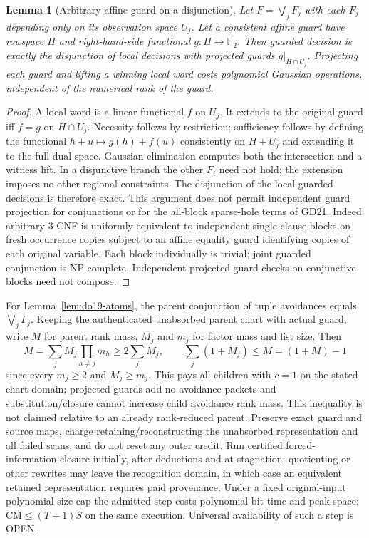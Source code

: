 \documentclass[11pt]{article}
\newtheorem{lemma}[theorem]{Lemma}
\begin{document}
\begin{lemma}[Arbitrary affine guard on a disjunction]\label{lem:do19-guard}
Let $F=\bigvee_j F_j$ with each $F_j$ depending only on its observation space $U_j$. Let a consistent affine guard have rowspace $H$ and right-hand-side functional $g:H\to\mathbb F_2$. Then guarded decision is exactly the disjunction of local decisions with projected guards $g|_{H\cap U_j}$. Projecting each guard and lifting a winning local word costs polynomial Gaussian operations, independent of the numerical rank of the guard.
\end{lemma}
\begin{proof}
A local word is a linear functional $f$ on $U_j$. It extends to the original guard iff $f=g$ on $H\cap U_j$. Necessity follows by restriction; sufficiency follows by defining the functional $h+u\mapsto g(h)+f(u)$ consistently on $H+U_j$ and extending it to the full dual space. Gaussian elimination computes both the intersection and a witness lift. In a disjunctive branch the other $F_i$ need not hold; the extension imposes no other regional constraints. The disjunction of the local guarded decisions is therefore exact. This argument does not permit independent guard projection for conjunctions or for the all-block sparse-hole terms of GD21. Indeed arbitrary 3-CNF is uniformly equivalent to independent single-clause blocks on fresh occurrence copies subject to an affine equality guard identifying copies of each original variable. Each block individually is trivial; joint guarded conjunction is NP-complete. Independent projected guard checks on conjunctive blocks need not compose.
\end{proof}

For Lemma~\ref{lem:do19-atoms}, the parent conjunction of tuple avoidances equals $\bigvee_j F_j$. Keeping the authenticated unabsorbed parent chart with actual guard, write $M$ for parent rank mass, $M_j$ and $m_j$ for factor mass and list size. Then
\[
 M=\sum_j M_j\prod_{h\ne j}m_h\ge2\sum_jM_j,\qquad
 \sum_j(1+M_j)\le M=(1+M)-1
\]
since every $m_j\ge2$ and $M_j\ge m_j$. This pays all children with $c=1$ on the stated chart domain; projected guards add no avoidance packets and substitution/closure cannot increase child avoidance rank mass. This inequality is not claimed relative to an already rank-reduced parent. Preserve exact guard and source maps, charge retaining/reconstructing the unabsorbed representation and all failed scans, and do not reset any outer credit. Run certified forced-information closure initially, after deductions and at stagnation; quotienting or other rewrites may leave the recognition domain, in which case an equivalent retained representation requires paid provenance. Under a fixed original-input polynomial size cap the admitted step costs polynomial bit time and peak space; $\mathrm{CM}\le(T+1)S$ on the same execution. Universal availability of such a step is OPEN.
\end{document}
